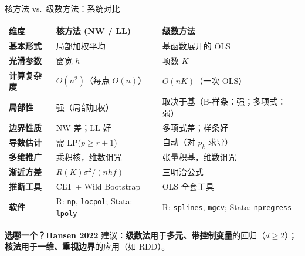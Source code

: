 \documentclass[aspectratio=169, 10pt]{beamer}
\renewcommand{\arraystretch}{1.05}
\begin{document}
\begin{frame}{核方法 vs.\ 级数方法：系统对比}
  \centering\small
  \renewcommand{\arraystretch}{1.25}
  \begin{tabular}{@{}p{3.2cm}p{5.2cm}p{5.2cm}@{}}
    \toprule
    \textbf{维度} & \textbf{核方法 (NW / LL)} & \textbf{级数方法} \\
    \midrule
    \textbf{基本形式} & 局部加权平均 & 基函数展开的 OLS \\
    \textbf{光滑参数} & 窗宽 $h$ & 项数 $K$ \\
    \textbf{计算复杂度} & $O(n^2)$（每点 $O(n)$） & $O(n K)$（一次 OLS） \\
    \textbf{局部性} & 强（局部加权） & 取决于基（B-样条：强；多项式：弱） \\
    \textbf{边界性质} & NW 差；LL 好 & 多项式差；样条好 \\
    \textbf{导数估计} & 需 LP($p\geq r+1$) & 自动（对 $p_k$ 求导） \\
    \textbf{多维推广} & 乘积核，维数诅咒 & 张量积基，维数诅咒 \\
    \textbf{渐近方差} & $R(K)\sigma^2/(nhf)$ & 三明治公式 \\
    \textbf{推断工具} & CLT + Wild Bootstrap & OLS 全套工具 \\
    \textbf{软件} & R: \texttt{np}, \texttt{locpol}; Stata: \texttt{lpoly} & R: \texttt{splines}, \texttt{mgcv}; Stata: \texttt{npregress} \\
    \bottomrule
  \end{tabular}

  \begin{keybox}
    \textbf{选哪一个？}\textbf{Hansen 2022} 建议：\textbf{级数法}用于\textbf{多元、带控制变量}的回归（$d\geq 2$）；\textbf{核法}用于\textbf{一维、重视边界}的应用（如 RDD）。
  \end{keybox}
\end{frame}
\end{document}
